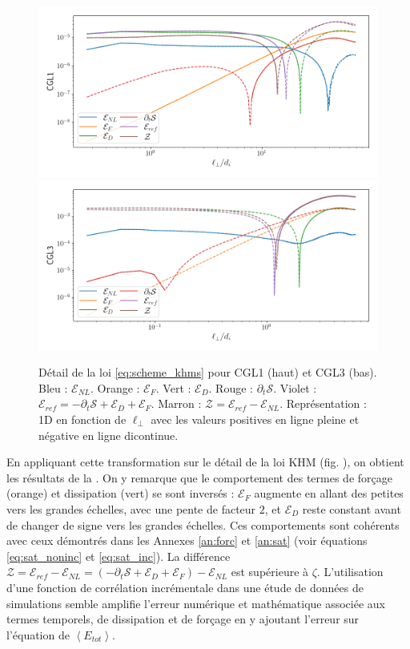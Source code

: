 \begin{figure}[!ht]
 \centering
\includegraphics[width=0.9\linewidth,trim=0cm 0cm 0cm 0cm, clip=true]{./Part_3/images_ch2/CGL1_1D_lperp_allSl}
\includegraphics[width=0.9\linewidth,trim=0cm 0cm 0cm 0cm, clip=true]{./Part_3/images_ch2/CGL3_1D_lperp_allSl}
\cprotect\caption{Détail de la loi \eqref{eq:scheme_khms} pour CGL1 (haut) et CGL3 (bas). Bleu : $\mathcal{E}_{NL}$. Orange : $\mathcal{E}_{F}$. Vert : $\mathcal{E}_{D}$. Rouge : $\partial_t \mathcal{S}$. Violet : $\mathcal{E}_{ref} =- \partial_t \mathcal{S}  + \mathcal{E}_{D} + \mathcal{E}_{F}$. Marron : $\mathcal{Z} = \mathcal{E}_{ref} - \mathcal{E}_{NL}$. Représentation : \acs{1D} en fonction de $\ell_{\perp}$ avec les valeurs positives en ligne pleine et négative en ligne dicontinue. }
\label{fig:KHMS}
\end{figure}
En appliquant cette transformation sur le détail de la loi \acs{KHM} (fig. ), on obtient les résultats de la  . On y remarque que le comportement des termes de forçage (orange) et dissipation (vert) se sont inversés : $\mathcal{E}_{F}$ augmente en allant des petites vers les grandes échelles, avec une pente de facteur $2$, et $\mathcal{E}_{D} $ reste constant avant de changer de signe vers les grandes échelles. Ces comportements sont cohérents avec ceux démontrés dans les Annexes \ref{an:forc} et \ref{an:sat} (voir équations \eqref{eq:sat_noninc} et \eqref{eq:sat_inc}). La différence $ \mathcal{Z} = \mathcal{E}_{ref} - \mathcal{E}_{NL} = (- \partial_t \mathcal{S} + \mathcal{E}_{D} + \mathcal{E}_{F}) - \mathcal{E}_{NL}$ est supérieure à $\zeta$. L'utilisation d'une fonction de corrélation incrémentale dans une étude de données de simulations semble amplifie l'erreur numérique et mathématique associée aux termes temporels, de dissipation et de forçage en y ajoutant l'erreur sur l'équation de $\left<E_{tot}\right>$. 

